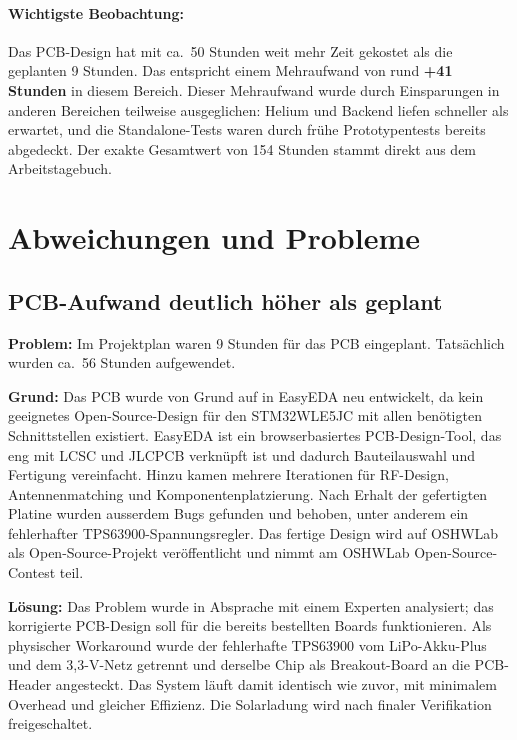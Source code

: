 \documentclass[11pt,a4paper]{scrartcl}
\begin{document}
\paragraph{Wichtigste Beobachtung:} Das PCB-Design hat mit ca.\ 50 Stunden weit mehr
Zeit gekostet als die geplanten 9 Stunden. Das entspricht einem Mehraufwand von rund
\textbf{+41 Stunden} in diesem Bereich. Dieser Mehraufwand wurde durch Einsparungen in
anderen Bereichen teilweise ausgeglichen: Helium und Backend liefen schneller als
erwartet, und die Standalone-Tests waren durch frühe Prototypentests bereits
abgedeckt. Der exakte Gesamtwert von 154 Stunden stammt direkt aus dem Arbeitstagebuch.


\section{Abweichungen und Probleme}

\subsection{PCB-Aufwand deutlich höher als geplant}

\textbf{Problem:} Im Projektplan waren 9 Stunden für das PCB eingeplant. Tatsächlich
wurden ca.\ 56 Stunden aufgewendet.

\textbf{Grund:} Das PCB wurde von Grund auf in EasyEDA neu entwickelt, da kein
geeignetes Open-Source-Design für den STM32WLE5JC mit allen benötigten Schnittstellen
existiert. EasyEDA ist ein browserbasiertes PCB-Design-Tool, das eng mit LCSC und
JLCPCB verknüpft ist und dadurch Bauteilauswahl und Fertigung vereinfacht. Hinzu kamen
mehrere Iterationen für RF-Design, Antennenmatching und Komponentenplatzierung. Nach
Erhalt der gefertigten Platine wurden ausserdem Bugs gefunden und behoben, unter
anderem ein fehlerhafter TPS63900-Spannungsregler. Das fertige Design wird auf
OSHWLab als Open-Source-Projekt veröffentlicht und nimmt am OSHWLab Open-Source-Contest
teil.

\textbf{Lösung:} Das Problem wurde in Absprache mit einem Experten analysiert; das
korrigierte PCB-Design soll für die bereits bestellten Boards funktionieren.
Als physischer Workaround wurde der fehlerhafte TPS63900 vom LiPo-Akku-Plus und dem
3{,}3-V-Netz getrennt und derselbe Chip als Breakout-Board an die PCB-Header angesteckt.
Das System läuft damit identisch wie zuvor, mit minimalem Overhead und gleicher Effizienz.
Die Solarladung wird nach finaler Verifikation freigeschaltet.
\end{document}
